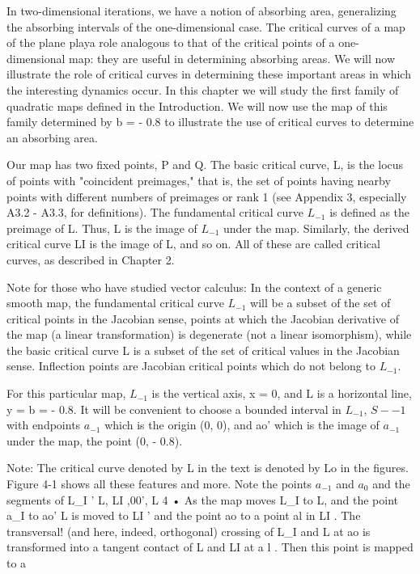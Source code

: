 \documentclass{article}
\begin{document}
In two-dimensional iterations, we have a notion of absorbing
area, generalizing the absorbing intervals of the one-dimensional
case. The critical curves of a map of the plane playa role analogous
to that of the critical points of a one-dimensional map: they are useful
in determining absorbing areas. We will now illustrate the role
of critical curves in determining these important areas in which the
interesting dynamics occur.
In this chapter we will study the first family of quadratic maps
defined in the Introduction. We will now use the map of this family
determined by b = - 0.8 to illustrate the use of critical curves to
determine an absorbing area.

Our map has two fixed points, P and Q. The basic critical
curve, L, is the locus of points with "coincident preimages," that is,
the set of points having nearby points with different numbers of
preimages or rank 1 (see Appendix 3, especially A3.2 - A3.3, for
definitions). The fundamental critical curve $L_{-1}$ is defined as the
preimage of L. Thus, L is the image of $L_{-1}$ under the map. Similarly,
the derived critical curve LI is the image of L, and so on. All
of these are called critical curves, as described in Chapter 2.

Note for those who have studied vector calculus: In the context
of a generic smooth map, the fundamental critical curve $L_{-1}$ will be
a subset of the set of critical points in the Jacobian sense, points at
which the Jacobian derivative of the map (a linear transformation)
is degenerate (not a linear isomorphism), while the basic critical
curve L is a subset of the set of critical values in the Jacobian sense.
Inflection points are Jacobian critical points which do not belong to
$L_{-1}$.

For this particular map, $L_{-1}$ is the vertical axis, x = 0, and L is a
horizontal line, y = b = - 0.8. It will be convenient to choose a
bounded interval in $L_{-1}$, $S-{-1}$ with endpoints $a_{-1}$ which is the origin
(0, 0), and ao' which is the image of $a_{-1}$ under the map, the
point (0, - 0.8).

Note: The critical curve denoted by L in the text is denoted by
Lo in the figures.
Figure 4-1 shows all these features and more. Note the points
$a_{-1}$ and $a_0$ and the segments of L_I ' L, LI ,00', L 4 • As the map
moves L_I to L, and the point a_I to ao' L is moved to LI ' and the
point ao to a point al in LI . The transversal! (and here, indeed,
orthogonal) crossing of L_I and L at ao is transformed into a tangent
contact of L and LI at a l . Then this point is mapped to a
\end{document}

